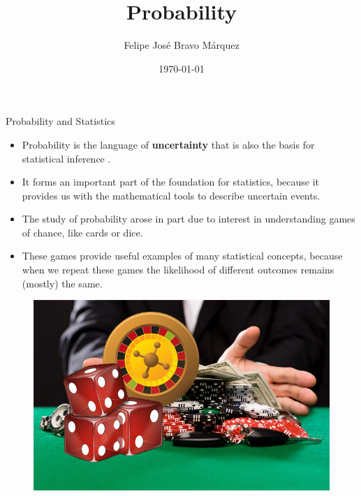 \documentclass[handout]{beamer}
\title{Probability}
\author[Felipe Bravo Márquez]{\footnotesize
 \textcolor[rgb]{0.00,0.00,1.00}{Felipe José Bravo Márquez}}
\date{ \today }
\begin{document}
\begin{frame}
\titlepage


\end{frame}



\begin{frame}{Probability and Statistics}

\scriptsize{
\begin{itemize}
 \item Probability is the language of \textbf{uncertainty} that is also the basis for statistical inference \cite{poldrack2019statistical}. 

 \item It forms an important part of the foundation for statistics, because it provides us with the mathematical tools to describe uncertain events. 
 \item The study of probability arose in part due to interest in understanding games of chance, like cards or dice. 
 \item These games provide useful examples of many statistical concepts, because when we repeat these games the likelihood of different outcomes remains (mostly) the same.
\end{itemize}

\begin{figure}[h!]
	\centering
	\includegraphics[scale=0.2]{pics/gambling.png}
\end{figure}


}

\end{frame}
\end{document}
